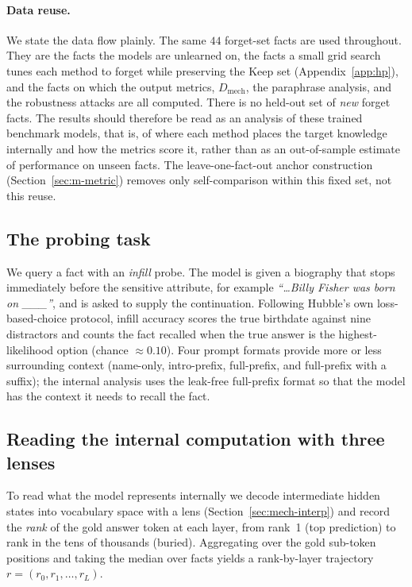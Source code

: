 \paragraph{Data reuse.}
We state the data flow plainly. The same $44$ forget-set facts are used throughout. They are the facts the
models are unlearned on, the facts a small grid search tunes each method to forget while preserving the
Keep set (Appendix~\ref{app:hp}), and the facts on which the output metrics, $D_\text{mech}$, the paraphrase
analysis, and the robustness attacks are all computed. There is no held-out set of \emph{new} forget facts.
The results should therefore be read as an analysis of these trained benchmark models, that is, of where
each method places the target knowledge internally and how the metrics score it, rather than as an
out-of-sample estimate of performance on unseen facts. The leave-one-fact-out anchor construction
(Section~\ref{sec:m-metric}) removes only self-comparison within this fixed set, not this reuse.

\subsection{The probing task}
\label{sec:m-probe}

We query a fact with an \emph{infill} probe. The model is given a biography that stops immediately before
the sensitive attribute, for example \emph{``\ldots{}Billy Fisher was born on \_\_\_''}, and is asked to
supply the continuation. Following Hubble's own loss-based-choice protocol, infill accuracy scores the
true birthdate against nine distractors and counts the fact recalled when the true answer is the
highest-likelihood option (chance $\approx 0.10$). Four prompt formats provide more or less surrounding
context (name-only, intro-prefix, full-prefix, and full-prefix with a suffix); the internal analysis uses
the leak-free full-prefix format so that the model has the context it needs to recall the fact.

\subsection{Reading the internal computation with three lenses}
\label{sec:m-lens}

To read what the model represents internally we decode intermediate hidden states into vocabulary space
with a lens (Section~\ref{sec:mech-interp}) and record the \emph{rank} of the gold answer token at each
layer, from rank~1 (top prediction) to rank in the tens of thousands (buried). Aggregating over the gold
sub-token positions and taking the median over facts yields a rank-by-layer trajectory
$r = (r_0, r_1, \ldots, r_L)$.

